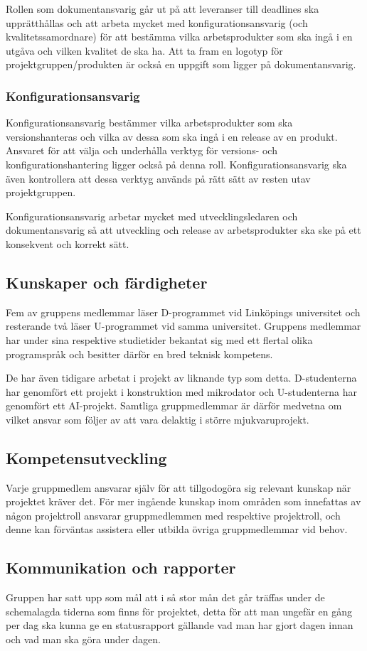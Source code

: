 \documentclass[a4paper,10pt, twoside]{article}
\begin{document}
Rollen som dokumentansvarig går ut på att leveranser till deadlines ska upprätthållas och att arbeta mycket med konfigurationsansvarig (och kvalitetssamordnare) för att bestämma vilka arbetsprodukter som ska ingå i en utgåva och vilken kvalitet de ska ha. Att ta fram en logotyp för projektgruppen/produkten är också en uppgift som ligger på dokumentansvarig.
\subsubsection{Konfigurationsansvarig}
Konfigurationsansvarig bestämmer vilka arbetsprodukter som ska versionshanteras och vilka av dessa som ska ingå i en release av en produkt. Ansvaret för att välja och underhålla verktyg för versions- och konfigurationshantering ligger också på denna roll. Konfigurationsansvarig ska även kontrollera att dessa verktyg används på rätt sätt av resten utav projektgruppen.

Konfigurationsansvarig arbetar mycket med utvecklingsledaren och dokumentansvarig så att utveckling och release av arbetsprodukter ska ske på ett konsekvent och korrekt sätt.
\subsection{Kunskaper och färdigheter}
Fem av gruppens medlemmar läser D-programmet vid Linköpings universitet och resterande två läser U-programmet vid samma universitet. Gruppens medlemmar har under sina respektive studietider bekantat sig med ett flertal olika programspråk och besitter därför en bred teknisk kompetens.

De har även tidigare arbetat i projekt av liknande typ som detta. D-studenterna har genomfört ett projekt i konstruktion med mikrodator och U-studenterna har genomfört ett AI-projekt. Samtliga gruppmedlemmar är därför medvetna om vilket ansvar som följer av att vara delaktig i större mjukvaruprojekt.
\subsection{Kompetensutveckling}
Varje gruppmedlem ansvarar själv för att tillgodogöra sig relevant kunskap när projektet kräver det. För mer ingående kunskap inom områden som innefattas av någon projektroll ansvarar gruppmedlemmen med respektive projektroll, och denne kan förväntas assistera eller utbilda övriga gruppmedlemmar vid behov.
\subsection{Kommunikation och rapporter}
Gruppen har satt upp som mål att i så stor mån det går träffas under de schemalagda tiderna som finns för projektet, detta för att man ungefär en gång per dag ska kunna ge en statusrapport gällande vad man har gjort dagen innan och vad man ska göra under dagen.
\end{document}
